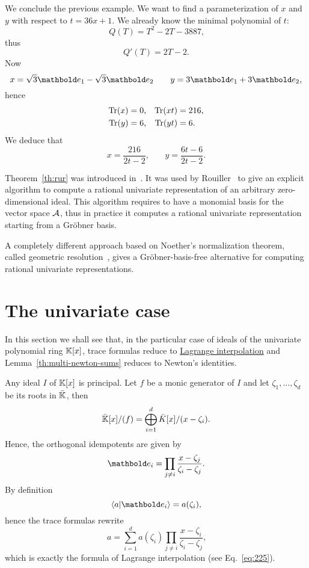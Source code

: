 \begin{example}
  We conclude the previous example. We want to find a parameterization
  of $x$ and $y$ with respect to $t=36x+1$. We already know the
  minimal polynomial of $t$:
  \[Q(T) = T^2-2T-3887\text{,}\]
  thus
  \[Q'(T) = 2T-2\text{.}\]
  Now
  \[x=\sqrt{3}\basis{e}_1 -\sqrt{3}\basis{e}_2 \qquad
  y = 3\basis{e}_1 + 3\basis{e}_2\text{,}\]
  hence 
  \begin{align*}
    \operatorname{Tr}(x) &= 0\text{,} & \operatorname{Tr}(xt) &= 216\text{,}\\
    \operatorname{Tr}(y) &= 6\text{,} & \operatorname{Tr}(yt) &= 6\text{.}
  \end{align*}
  We deduce that
  \[x=\frac{216}{2t-2}\text{,}\qquad
  y=\frac{6t-6}{2t-2}\text{.}\]
\end{example}

\begin{nota}
  Theorem~\ref{th:rur} was introduced
  in~\cite{alonso+becker+roy+wormann}. It was used by
  Rouiller~\cite{rouiller99} to give an explicit algorithm to compute
  a rational univariate representation of an arbitrary
  zero-dimensional ideal. This algorithm requires to have a monomial
  basis for the vector space $\mathcal{A}$, thus in practice it computes
  a rational univariate representation starting from a Gröbner basis.

  A completely different approach based on Noether's normalization
  theorem, called geometric resolution~\cite{giusti+lecerf+salvy01},
  gives a Gröbner-basis-free alternative for computing rational
  univariate representations.
\end{nota}


\section{The univariate case}
\label{sec:univariate-case}
In this section we shall see that, in the particular case of ideals of
the univariate polynomial ring $\mathbb{K}[x]$, trace formulas reduce to
\hyperref[sec:chin-rema-algor]{Lagrange interpolation} and
Lemma~\ref{th:multi-newton-sums} reduces to Newton's identities.

Any ideal $I$ of $\mathbb{K}[x]$ is principal. Let $f$ be a monic generator of
$I$ and let $\zeta_1,\ldots,\zeta_d$ be its roots in $\bar{\mathbb{K}}$, then
\begin{equation}
  \label{eq:20}
  \bar{\mathbb{K}}[x]/(f) = \bigoplus_{i=1}^d \bar{K}[x]/(x-\zeta_i)
  \text{.}
\end{equation}
Hence, the orthogonal idempotents are given by
\begin{equation}
  \label{eq:29}
  \basis{e}_i = \prod_{j\ne i}\frac{x-\zeta_j}{\zeta_i-\zeta_j}
  \text{.}
\end{equation}
By definition
\begin{equation}
  \label{eq:31}
  \braket{a}{\basis{e_i}} = a(\zeta_i)
  \text{,}
\end{equation}
hence the trace formulas rewrite
\begin{equation}
  \label{eq:35}
  a = \sum_{i=1}^d a(\zeta_i)\prod_{j\ne i}\frac{x-\zeta_i}{\zeta_i-\zeta_j}
  \text{,}
\end{equation}
which is exactly the formula of Lagrange interpolation (see
Eq.~\eqref{eq:225}).

